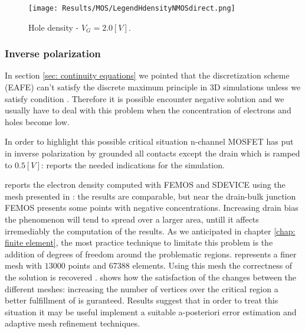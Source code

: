 \vspace{0.5cm}

\begin{figure}[!h]
\centering
{}
\hspace{0.06\textwidth}
\hspace{0.04\textwidth}
{\texttt{[image: Results/MOS/LegendHdensityNMOSdirect.png]}}
\caption{Hole density - $V_G = 2.0 [V]$.}
\label{fig: pdensity mos}
\end{figure}




\subsubsection{Inverse polarization}
\label{sec: inv pol mos}

In section \ref{sec: continuity equations} we pointed that the discretization scheme (EAFE) can't satisfy the discrete maximum principle in 3D simulations unless we satisfy condition  .  Therefore it is possible encounter negative solution and we usually have to deal with this problem when the concentration of electrons and holes become low.

In order to highlight this possible critical situation n-channel MOSFET has put in inverse polarization by grounded all contacts except the drain which is ramped to $0.5[V]$:  reports the needed indications for the simulation.

 reports the electron density computed with FEMOS and SDEVICE using the mesh presented in : the results are comparable, but near the drain-bulk junction FEMOS presents some points with negative concentrations. Increasing drain bias  the phenomenon will tend to spread over a larger area, untill it affects irremediably the computation of the results.
As we anticipated in chapter \ref{chap: finite element}, the most practice technique to limitate this problem is the addition of degrees of freedom around the problematic regions.
 represents a finer mesh with $13000$ points and $67388$ elements. Using this mesh the correctness of the solution is recovered .  shows how the satisfaction of the  changes between the different meshes: increasing the number of vertices over the critical region a better fulfillment of  is guranteed. 
Results suggest that in order to treat this situation it may be useful implement a suitable a-posteriori error estimation and adaptive mesh refinement techniques. 

